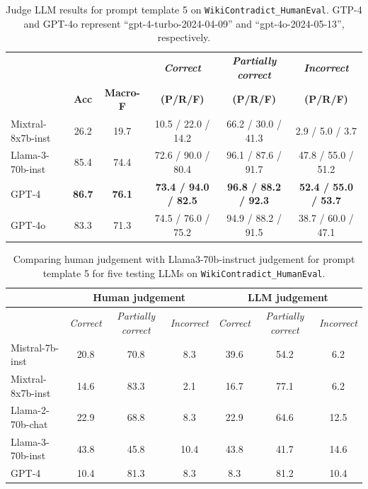 \documentclass{article}
\begin{document}
  

\begin{table}[t]
    \centering
    \caption{Judge LLM results for prompt template 5 on \texttt{WikiContradict\_HumanEval}. GTP-4 and GPT-4o represent ``gpt-4-turbo-2024-04-09'' and ``gpt-4o-2024-05-13'', respectively.}
    \label{tab:auto_eval_llmjudge}
    \begin{small}
    \begin{tabular}{|l|c|c|c|c|c|}
    \hline

        ~ &  &  & \emph{\textbf{Correct}}  &\emph{\textbf{Partially correct}}  & \emph{\textbf{Incorrect}}   \\ 
        ~ & \textbf{Acc} & \textbf{Macro-F} & \textbf{(P/R/F)} & \textbf{(P/R/F)} &  \textbf{(P/R/F)}  \\ \hline    
  Mixtral-8x7b-inst & 26.2 & 19.7 &  10.5 / 22.0 / 14.2  &  66.2 / 30.0 / 41.3  &  2.9 / 5.0 / 3.7 \\ \hline
        Llama-3-70b-inst & 85.4 & 74.4 &  72.6 / 90.0 / 80.4  &  96.1 / 87.6 / 91.7  &  47.8 / 55.0 / 51.2 \\ \hline
        GPT-4 & \textbf{86.7} & \textbf{76.1} &  \textbf{73.4 / 94.0 / 82.5}  &  \textbf{96.8 / 88.2 / 92.3}  &  \textbf{52.4 / 55.0 / 53.7} \\ \hline
        GPT-4o& 83.3 & 71.3 &  74.5 / 76.0 / 75.2  &  94.9 / 88.2 / 91.5  &  38.7 / 60.0 / 47.1 \\ \hline
    \end{tabular}
    \end{small}
\end{table}


\begin{table}[t]
    \centering
    \caption{Comparing human judgement with Llama3-70b-instruct judgement for prompt template 5 for five testing LLMs on \texttt{WikiContradict\_HumanEval}. }
    \label{tab:auto_eval_comp}
    \begin{small}
    \begin{tabular}{|l|c|c|c|c|c|c|}
    \hline
        & \multicolumn{3}{c|}{\textbf{Human judgement}}& \multicolumn{3}{c|}{\textbf{LLM judgement}} \\ \hline
        ~ & \emph{Correct} & \emph{Partially correct} & \emph{Incorrect} & \emph{Correct} & \emph{Partially correct} & \emph{Incorrect} \\ \hline
        Mistral-7b-inst & 20.8 & 70.8 & 8.3 & 39.6 & 54.2 & 6.2 \\ \hline
        Mixtral-8x7b-inst & 14.6 & 83.3 & 2.1 & 16.7 & 77.1 & 6.2 \\ \hline
        Llama-2-70b-chat & 22.9 & 68.8 & 8.3 & 22.9 & 64.6 & 12.5 \\ \hline
        Llama-3-70b-inst & 43.8 & 45.8 & 10.4 & 43.8 & 41.7 & 14.6 \\ \hline
        GPT-4 & 10.4 & 81.3 & 8.3 & 8.3 & 81.2 & 10.4 \\ \hline
    \end{tabular}
    \end{small}
\end{table}
\end{document}
